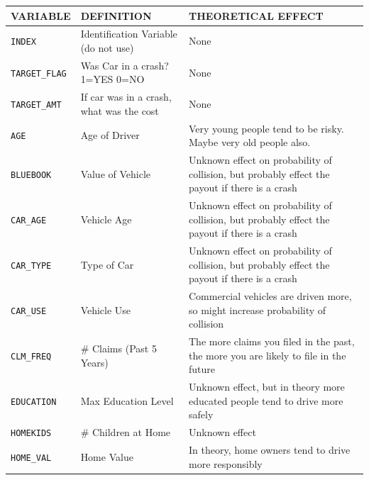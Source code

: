\documentclass[
]{article}
\begin{document}
\begin{longtable}[]{@{}
  >{\raggedright\arraybackslash}p{}
  >{\raggedright\arraybackslash}p{}
  >{\raggedright\arraybackslash}p{}@{}}
\toprule\noalign{}
\begin{minipage}[b]{\linewidth}\raggedright
\textbf{VARIABLE}
\end{minipage} & \begin{minipage}[b]{\linewidth}\raggedright
\textbf{DEFINITION}
\end{minipage} & \begin{minipage}[b]{\linewidth}\raggedright
\textbf{THEORETICAL EFFECT}
\end{minipage} \\
\midrule\noalign{}
\endhead
\bottomrule\noalign{}
\endlastfoot
\texttt{INDEX} & Identification Variable (do not use) & None \\
\texttt{TARGET\_FLAG} & Was Car in a crash? 1=YES 0=NO & None \\
\texttt{TARGET\_AMT} & If car was in a crash, what was the cost &
None \\
\texttt{AGE} & Age of Driver & Very young people tend to be risky. Maybe
very old people also. \\
\texttt{BLUEBOOK} & Value of Vehicle & Unknown effect on probability of
collision, but probably effect the payout if there is a crash \\
\texttt{CAR\_AGE} & Vehicle Age & Unknown effect on probability of
collision, but probably effect the payout if there is a crash \\
\texttt{CAR\_TYPE} & Type of Car & Unknown effect on probability of
collision, but probably effect the payout if there is a crash \\
\texttt{CAR\_USE} & Vehicle Use & Commercial vehicles are driven more,
so might increase probability of collision \\
\texttt{CLM\_FREQ} & \# Claims (Past 5 Years) & The more claims you
filed in the past, the more you are likely to file in the future \\
\texttt{EDUCATION} & Max Education Level & Unknown effect, but in theory
more educated people tend to drive more safely \\
\texttt{HOMEKIDS} & \# Children at Home & Unknown effect \\
\texttt{HOME\_VAL} & Home Value & In theory, home owners tend to drive
more responsibly \\

\end{longtable}
\end{document}
